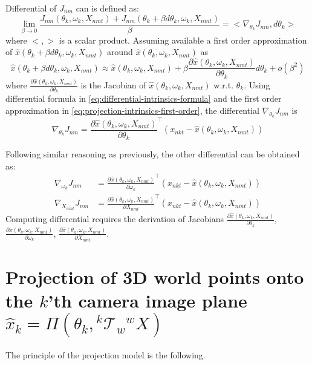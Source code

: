 \documentclass{article}
\begin{document}
Differential of $J_{nm}$ can is defined as:
\begin{equation}\label{eq:differential-intrinsics-formula}
\lim_{\beta \rightarrow 0} \frac{J_{nm}(\theta_k,\omega_k,X_{nmt}) + J_{nm}(\theta_k+\beta d\theta_k,\omega_k ,X_{nmt})}{\beta} = <\nabla_{\theta_k}J_{nm}, d\theta_k>
\end{equation}
where $<,>$ is a scalar product. 
%
Assuming available a first order approximation of $\hat{x}(\theta_k +\beta d\theta_k,\omega_k,X_{nmt})$ around $\hat{x}(\theta_k,\omega_k,X_{nmt})$ as 
\begin{equation}
\hat{x}(\theta_k +\beta d\theta_k,\omega_k,X_{nmt}) \approx \hat{x}(\theta_k,\omega_k,X_{nmt}) + \beta \frac{\partial \hat{x}(\theta_k,\omega_k,X_{nmt})}{\partial \theta_k}d\theta_k +o(\beta^2)
\end{equation}\label{eq:projection-intrinsics-first-order}
where $\frac{\partial \hat{x}(\theta_k,\omega_k,X_{nmt})}{\partial \theta_k}$ is the Jacobian of $\hat{x}(\theta_k,\omega_k,X_{nmt})$ w.r.t. $\theta_k$.
Using differential formula in \eqref{eq:differential-intrinsics-formula} and the first order approximation in \eqref{eq:projection-intrinsics-first-order}, the differential $\nabla_{\theta_k}J_{nm}$ is
\begin{equation}
\nabla_{\theta_k}J_{nm} = \frac{\partial \hat{x}(\theta_k,\omega_k,X_{nmt})}{\partial \theta_k}^{\top}(x_{nkt} - \hat{x}(\theta_k,\omega_k,X_{nmt}))
\end{equation}

Following similar reasoning as previously, the other differential can be obtained as:
\begin{align*}
\nabla_{\omega_k}J_{nm} &= \frac{\partial \hat{x}(\theta_k,\omega_k,X_{nmt})}{\partial \omega_k}^{\top}(x_{nkt} - \hat{x}(\theta_k,\omega_k,X_{nmt})) \\
\nabla_{X_{nmt}}J_{nm} &= \frac{\partial \hat{x}(\theta_k,\omega_k,X_{nmt})}{\partial X_{nmt}}^{\top}(x_{nkt} - \hat{x}(\theta_k,\omega_k,X_{nmt}))
\end{align*}
Computing differential requires the derivation of Jacobians $ \frac{\partial \hat{x}(\theta_k,\omega_k,X_{nmt})}{\partial \theta_k}$, $\frac{\partial \hat{x}(\theta_k,\omega_k,X_{nmt})}{\partial \omega_k}$, $\frac{\partial \hat{x}(\theta_k,\omega_k,X_{nmt})}{\partial X_{nmt}}$.



\appendix

\section{Projection of 3D world points onto the $k$'th camera image plane $\hat{x}_{k} = \Pi(\theta_k, {}^k\mathcal{T}_w {}^wX)$}
The principle of the projection model is the following. 
\end{document}

